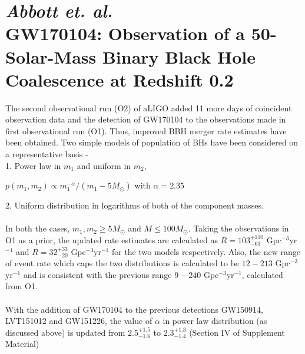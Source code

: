 \documentclass{article}
\numberwithin{equation}{section}
\begin{document}
\section*{\normalsize{\textit{Abbott et. al.\\}}\small{GW170104: Observation of a 50-Solar-Mass Binary Black Hole Coalescence at Redshift 0.2}}
The second observational run (O2) of aLIGO added 11 more days of coincident observation data and the detection of GW170104 to the observations made in first observational run (O1). Thus, improved BBH merger rate estimates have been obtained. Two simple models of population of BHs have been considered on a representative basis -\\
1. Power law in $m_1$ and uniform in $m_2$,
\begin{center}
	$p(m_1,m_2) \propto m_1^{-\alpha}/(m_1-5M_\odot)$ with $\alpha = 2.35$\\
\end{center}
2. Uniform distribution in logarithms of both of the component masses.\\
\\
In both the cases, $m_1,m_2\geqslant 5M_\odot$ and $M\leqslant100M_\odot$. Taking the observations in O1 as a prior, the updated rate estimates are calculated as $R = 103^{+110}_{-63}$ Gpc$^{-3}$yr$^{-1}$ and $R = 32^{+33}_{-20}$ Gpc$^{-3}$yr$^{-1}$ for the two models respectively. Also, the new range of event rate which caps the two distributions is calculated to be $12 - 213$ Gpc$^{-3}$yr$^{-1}$ and is consistent with the previous range $9 - 240$ Gpc$^{-3}$yr$^{-1}$, calculated from O1.\\
\\
With the addition of GW170104 to the previous detections GW150914, LVT151012 and GW151226, the value of $\alpha$ in power law distribution (as discussed above) is updated from $2.5^{+1.5}_{-1.6}$ to $2.3^{+1.3}_{-1.4}$ (Section IV of Supplement Material\cite{1})
\end{document}
